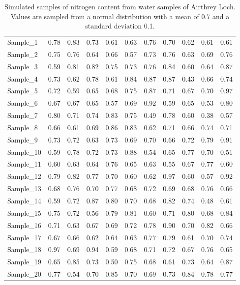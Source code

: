 \documentclass[
]{scrbook}
\begin{document}
\begin{longtable}[]{@{}lrrrrrrrrrr@{}}
\caption{\label{tab:unnamed-chunk-44}Simulated samples of nitrogen content from water samples of Airthrey Loch. Values are sampled from a normal distribution with a mean of 0.7 and a standard deviation 0.1.}\tabularnewline
\toprule
\endhead
Sample\_1 & 0.78 & 0.83 & 0.73 & 0.61 & 0.63 & 0.76 & 0.70 & 0.62 & 0.61 & 0.61 \\
Sample\_2 & 0.75 & 0.76 & 0.64 & 0.66 & 0.57 & 0.73 & 0.76 & 0.63 & 0.69 & 0.76 \\
Sample\_3 & 0.59 & 0.81 & 0.82 & 0.75 & 0.73 & 0.76 & 0.84 & 0.60 & 0.64 & 0.87 \\
Sample\_4 & 0.73 & 0.62 & 0.78 & 0.61 & 0.84 & 0.87 & 0.87 & 0.43 & 0.66 & 0.74 \\
Sample\_5 & 0.72 & 0.59 & 0.65 & 0.68 & 0.75 & 0.87 & 0.71 & 0.67 & 0.70 & 0.97 \\
Sample\_6 & 0.67 & 0.67 & 0.65 & 0.57 & 0.69 & 0.92 & 0.59 & 0.65 & 0.53 & 0.80 \\
Sample\_7 & 0.80 & 0.71 & 0.74 & 0.83 & 0.75 & 0.49 & 0.78 & 0.60 & 0.38 & 0.57 \\
Sample\_8 & 0.66 & 0.61 & 0.69 & 0.86 & 0.83 & 0.62 & 0.71 & 0.66 & 0.74 & 0.71 \\
Sample\_9 & 0.73 & 0.72 & 0.63 & 0.73 & 0.69 & 0.70 & 0.66 & 0.72 & 0.79 & 0.91 \\
Sample\_10 & 0.59 & 0.78 & 0.72 & 0.73 & 0.88 & 0.54 & 0.65 & 0.77 & 0.70 & 0.51 \\
Sample\_11 & 0.60 & 0.63 & 0.64 & 0.76 & 0.65 & 0.63 & 0.55 & 0.67 & 0.77 & 0.60 \\
Sample\_12 & 0.79 & 0.82 & 0.77 & 0.70 & 0.60 & 0.62 & 0.97 & 0.60 & 0.57 & 0.92 \\
Sample\_13 & 0.68 & 0.76 & 0.70 & 0.77 & 0.68 & 0.72 & 0.69 & 0.68 & 0.76 & 0.66 \\
Sample\_14 & 0.59 & 0.72 & 0.87 & 0.80 & 0.70 & 0.68 & 0.82 & 0.74 & 0.48 & 0.61 \\
Sample\_15 & 0.75 & 0.72 & 0.56 & 0.79 & 0.81 & 0.60 & 0.71 & 0.80 & 0.68 & 0.84 \\
Sample\_16 & 0.71 & 0.63 & 0.67 & 0.69 & 0.72 & 0.78 & 0.90 & 0.70 & 0.82 & 0.66 \\
Sample\_17 & 0.67 & 0.66 & 0.62 & 0.64 & 0.63 & 0.77 & 0.79 & 0.61 & 0.70 & 0.74 \\
Sample\_18 & 0.97 & 0.69 & 0.94 & 0.59 & 0.68 & 0.71 & 0.72 & 0.67 & 0.76 & 0.65 \\
Sample\_19 & 0.65 & 0.85 & 0.73 & 0.50 & 0.75 & 0.68 & 0.61 & 0.73 & 0.64 & 0.87 \\
Sample\_20 & 0.77 & 0.54 & 0.70 & 0.85 & 0.70 & 0.69 & 0.73 & 0.84 & 0.78 & 0.77 \\
\bottomrule
\end{longtable}
\end{document}
